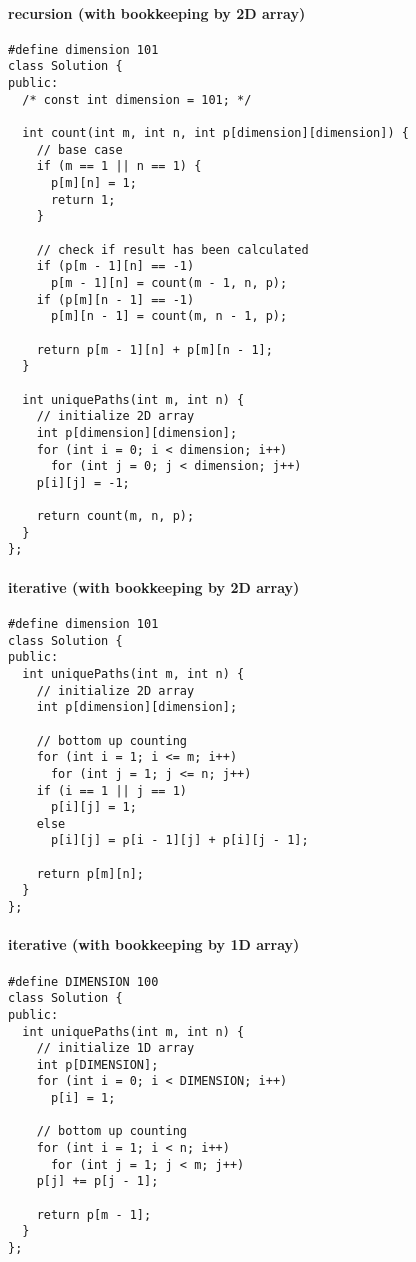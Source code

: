 \documentclass[12pt]{article}
\begin{document}
\paragraph{recursion (with bookkeeping by 2D array)}
\label{sec:orgbc66b0c}
\begin{verbatim}
#define dimension 101
class Solution {
public:
  /* const int dimension = 101; */

  int count(int m, int n, int p[dimension][dimension]) {
    // base case
    if (m == 1 || n == 1) {
      p[m][n] = 1;
      return 1;
    }

    // check if result has been calculated
    if (p[m - 1][n] == -1)
      p[m - 1][n] = count(m - 1, n, p);
    if (p[m][n - 1] == -1)
      p[m][n - 1] = count(m, n - 1, p);

    return p[m - 1][n] + p[m][n - 1];
  }

  int uniquePaths(int m, int n) {
    // initialize 2D array
    int p[dimension][dimension];
    for (int i = 0; i < dimension; i++)
      for (int j = 0; j < dimension; j++)
	p[i][j] = -1;

    return count(m, n, p);
  }
};
\end{verbatim}
\paragraph{iterative (with bookkeeping by 2D array)}
\label{sec:org2bc7641}
\begin{verbatim}
#define dimension 101
class Solution {
public: 
  int uniquePaths(int m, int n) {
    // initialize 2D array
    int p[dimension][dimension];

    // bottom up counting
    for (int i = 1; i <= m; i++)
      for (int j = 1; j <= n; j++)
	if (i == 1 || j == 1)
	  p[i][j] = 1;
	else
	  p[i][j] = p[i - 1][j] + p[i][j - 1];

    return p[m][n];
  }
};
\end{verbatim}
\paragraph{iterative (with bookkeeping by 1D array)}
\label{sec:orgd8cd3ae}
\begin{verbatim}
#define DIMENSION 100
class Solution {
public: 
  int uniquePaths(int m, int n) {
    // initialize 1D array
    int p[DIMENSION];
    for (int i = 0; i < DIMENSION; i++)
      p[i] = 1;

    // bottom up counting
    for (int i = 1; i < n; i++)
      for (int j = 1; j < m; j++)
	p[j] += p[j - 1];

    return p[m - 1];
  }
};
\end{verbatim}
\end{document}
